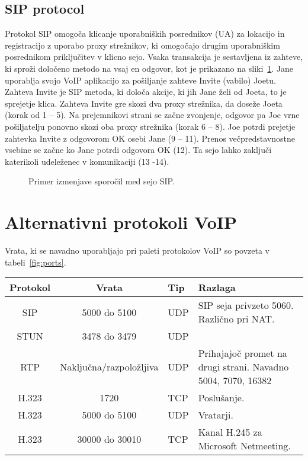 \documentclass{acm_proc_article-sp}
\begin{document}
\subsection{SIP protocol}

Protokol SIP\cite{SIP} omogoča klicanje uporabniških posrednikov (UA) za lokacijo in registracijo z uporabo proxy strežnikov, ki omogočajo drugim uporabniškim posrednikom priključitev v klicno sejo. Vsaka transakcija je sestavljena iz zahteve, ki sproži določeno metodo na vsaj en odgovor, kot je prikazano na sliki~\ref{fig:sip}. Jane uporablja svojo VoIP aplikacijo za pošiljanje zahteve Invite (vabilo) Joetu. Zahteva Invite je SIP metoda, ki določa akcije, ki jih Jane želi od Joeta, to je sprejetje klica. Zahteva Invite gre skozi dva proxy strežnika, da doseže Joeta (korak od 1 – 5). Na prejemnikovi strani se začne zvonjenje, odgovor pa Joe vrne pošiljatelju ponovno skozi oba proxy strežnika (korak 6 – 8). Joe potrdi prejetje zahtevka Invite z odgovorom OK osebi Jane (9 – 11). Prenos večpredstavnostne vsebine se začne ko Jane potrdi odgovora OK (12). Ta sejo lahko zaključi katerikoli udeleženec v komunikaciji (13 -14).

\begin{figure}
\centering
{} %
\caption{Primer izmenjave sporočil med sejo SIP.}
\label{fig:sip}
\end{figure}

\section{Alternativni protokoli VoIP}
Vrata, ki se navadno uporabljajo pri paleti protokolov VoIP so povzeta v tabeli~\ref{fig:ports}.

\begin{table*}
\centering
\caption{Uporaba vrat pri protokolu VoIP}
\label{fig:ports}
\begin{tabular}{|c|c|l|l|} \hline
  Protokol&Vrata&Tip&Razlaga\\ \hline
  SIP & 5000 do 5100& UDP & SIP seja privzeto 5060. Različno pri NAT.\\ \hline
  STUN & 3478 do 3479& UDP & \\ \hline
  RTP & Naključna/razpoložljiva & UDP & Prihajajoč promet na drugi strani. Navadno 5004, 7070, 16382\\ \hline
  H.323 & 1720 & TCP & Poslušanje.\\ \hline
  H.323 & 5000 do 5100 & UDP & Vratarji.\\ \hline
  H.323 & 30000 do 30010 & TCP & Kanal H.245 za Microsoft Netmeeting.\\
\hline\end{tabular}
\end{table*}
\end{document}

